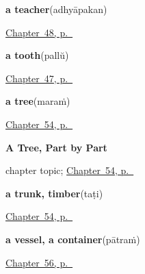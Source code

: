 \noindent\begin{minipage}[t]{\linewidth}
\raggedright
\textbf{a teacher}\enspace\emph{}\enspace(adhyāpakan)\par
\footnotesize \hyperref[ch:ml-roles]{Chapter~48, p.~\pageref*{ch:ml-roles}}
\end{minipage}\par\smallskip

\noindent\begin{minipage}[t]{\linewidth}
\raggedright
\textbf{a tooth}\enspace\emph{}\enspace(pallŭ)\par
\footnotesize \hyperref[ch:ml-body-more]{Chapter~47, p.~\pageref*{ch:ml-body-more}}
\end{minipage}\par\smallskip

\noindent\begin{minipage}[t]{\linewidth}
\raggedright
\textbf{a tree}\enspace\emph{}\enspace(maraṁ)\par
\footnotesize \hyperref[ch:ml-a-tree-part-by-part]{Chapter~54, p.~\pageref*{ch:ml-a-tree-part-by-part}}
\end{minipage}\par\smallskip

\noindent\begin{minipage}[t]{\linewidth}
\raggedright
\textbf{A Tree, Part by Part}\par
\footnotesize chapter topic; \hyperref[ch:ml-a-tree-part-by-part]{Chapter~54, p.~\pageref*{ch:ml-a-tree-part-by-part}}
\end{minipage}\par\smallskip

\noindent\begin{minipage}[t]{\linewidth}
\raggedright
\textbf{a trunk, timber}\enspace\emph{}\enspace(taṭi)\par
\footnotesize \hyperref[ch:ml-a-tree-part-by-part]{Chapter~54, p.~\pageref*{ch:ml-a-tree-part-by-part}}
\end{minipage}\par\smallskip

\noindent\begin{minipage}[t]{\linewidth}
\raggedright
\textbf{a vessel, a container}\enspace\emph{}\enspace(pātraṁ)\par
\footnotesize \hyperref[ch:ml-things-about-the-house]{Chapter~56, p.~\pageref*{ch:ml-things-about-the-house}}
\end{minipage}\par\smallskip

